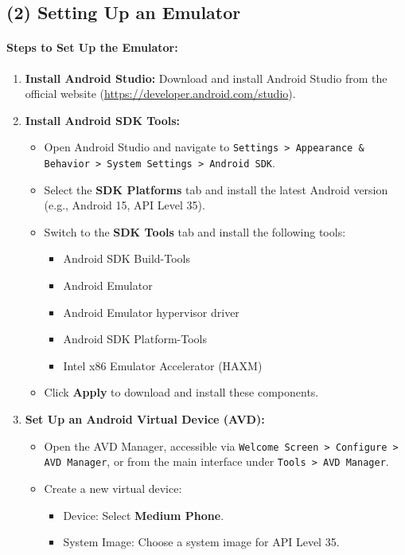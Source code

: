 \documentclass[12pt]{article}
\begin{document}
\subsection*{(2) Setting Up an Emulator}
\paragraph{Steps to Set Up the Emulator:}
\begin{enumerate}
    \item \textbf{Install Android Studio:} 
    Download and install Android Studio from the official website (\url{https://developer.android.com/studio}).
    \item \textbf{Install Android SDK Tools:}
    \begin{itemize}
        \item Open Android Studio and navigate to \texttt{Settings > Appearance \& Behavior > System Settings > Android SDK}.
        \item Select the \textbf{SDK Platforms} tab and install the latest Android version (e.g., Android 15, API Level 35).
        \item Switch to the \textbf{SDK Tools} tab and install the following tools:
        \begin{itemize}
            \item Android SDK Build-Tools
            \item Android Emulator
            \item Android Emulator hypervisor driver
            \item Android SDK Platform-Tools
            \item Intel x86 Emulator Accelerator (HAXM)
        \end{itemize}
        \item Click \textbf{Apply} to download and install these components.
    \end{itemize}
    \item \textbf{Set Up an Android Virtual Device (AVD):}
    \begin{itemize}
        \item Open the AVD Manager, accessible via \texttt{Welcome Screen > Configure > AVD Manager}, or from the main interface under \texttt{Tools > AVD Manager}.
        \item Create a new virtual device:
        \begin{itemize}
            \item Device: Select \textbf{Medium Phone}.
            \item System Image: Choose a system image for API Level 35.

\end{itemize}
\end{itemize}
\end{enumerate}
\end{document}
